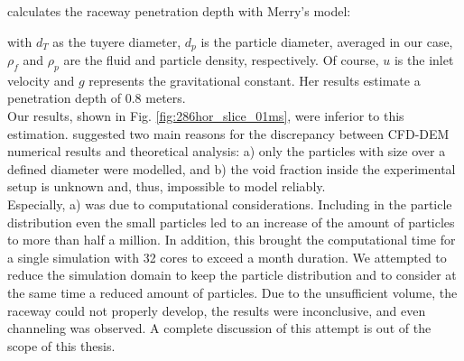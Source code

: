 \citet{RefWorks:208} calculates the raceway penetration depth with Merry's
model:

with $d_T$ as the tuyere diameter, $d_p$ is the particle diameter, averaged in
our case, $\rho_f$ and $\rho_p$ are the fluid and particle
density, respectively. Of course, $u$ is the inlet velocity and $g$ represents
the gravitational constant.
Her results estimate a penetration depth of 0.8 meters.\\
Our results, shown in Fig. \ref{fig:286hor_slice_01ms}, were inferior to this
estimation.
\citet{RefWorks:208} suggested two main reasons for the discrepancy between
\acs{CFD}-\acs{DEM} numerical results and theoretical analysis: a) only the
particles with size over a defined diameter were modelled, and b) the void
fraction inside the experimental setup is unknown and, thus, impossible to model
reliably.\\
Especially, a) was due to computational considerations.
Including in the particle distribution even the small particles led to an
increase of the amount of particles to more than half a million.
In addition, this brought the computational time for a single simulation with 32
cores to exceed a month duration.
We attempted to reduce the simulation domain to keep the particle distribution
and to consider at the same time a reduced amount of particles.
Due to the unsufficient volume, the raceway could not properly develop, the
results were inconclusive, and even channeling was observed.
A complete discussion of this attempt is out of the scope of this thesis.

